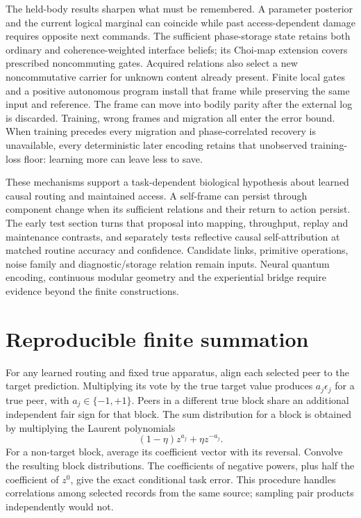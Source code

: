 \documentclass[11pt]{article}
\theoremstyle{definition}
\theoremstyle{remark}
\begin{document}
The held-body results sharpen what must be remembered. A parameter posterior and the current logical marginal can coincide while past access-dependent damage requires opposite next commands. The sufficient phase-storage state retains both ordinary and coherence-weighted interface beliefs; its Choi-map extension covers prescribed noncommuting gates. Acquired relations also select a new noncommutative carrier for unknown content already present. Finite local gates and a positive autonomous program install that frame while preserving the same input and reference. The frame can move into bodily parity after the external log is discarded. Training, wrong frames and migration all enter the error bound. When training precedes every migration and phase-correlated recovery is unavailable, every deterministic later encoding retains that unobserved training-loss floor: learning more can leave less to save.

These mechanisms support a task-dependent biological hypothesis about learned causal routing and maintained access. A self-frame can persist through component change when its sufficient relations and their return to action persist. The early test section turns that proposal into mapping, throughput, replay and maintenance contrasts, and separately tests reflective causal self-attribution at matched routine accuracy and confidence. Candidate links, primitive operations, noise family and diagnostic/storage relation remain inputs. Neural quantum encoding, continuous modular geometry and the experiential bridge require evidence beyond the finite constructions.

\appendix
\section{Reproducible finite summation}
\label{app:sum}

For any learned routing and fixed true apparatus, align each selected peer to the target prediction. Multiplying its vote by the true target value produces $a_j\epsilon_j$ for a true peer, with $a_j\in\{-1,+1\}$. Peers in a different true block share an additional independent fair sign for that block. The sum distribution for a block is obtained by multiplying the Laurent polynomials
\begin{equation}
 (1-\eta)z^{a_j}+\eta z^{-a_j}.
\end{equation}
For a non-target block, average its coefficient vector with its reversal. Convolve the resulting block distributions. The coefficients of negative powers, plus half the coefficient of $z^0$, give the exact conditional task error. This procedure handles correlations among selected records from the same source; sampling pair products independently would not.
\end{document}
